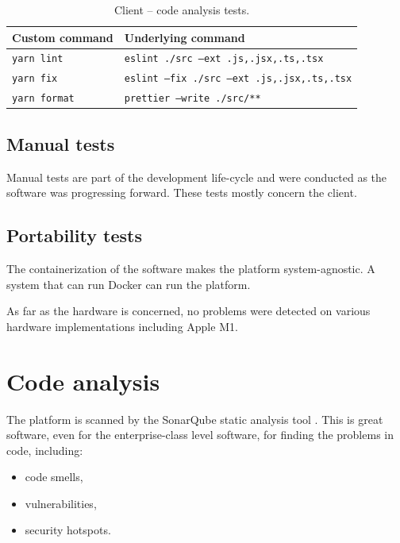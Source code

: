 \documentclass[a4paper,twoside,12pt]{book}
\begin{document}
\begin{table}%
\centering
\caption{Client – code analysis tests.}
\label{id:tab:client_tests}
\begin{tabular}{ll}
	\toprule
	Custom command               & Underlying command                                          \\
	\midrule
	\texttt{yarn lint}   & \texttt{eslint ./src --ext .js,.jsx,.ts,.tsx}       \\
	\texttt{yarn fix}    & \texttt{eslint --fix ./src --ext .js,.jsx,.ts,.tsx} \\
	\texttt{yarn format} & \texttt{prettier --write ./src/**}                  \\
	\bottomrule
\end{tabular}
\end{table}

\subsection{Manual tests}

Manual tests are part of the development life-cycle and were conducted as the software was progressing forward. These tests mostly concern the client.

\subsection{Portability tests}

The containerization of the software makes the platform system-agnostic. A system that can run Docker can run the platform.

As far as the hardware is concerned, no problems were detected on various hardware implementations including Apple M1.

\section{Code analysis}

The platform is scanned by the SonarQube static analysis tool \cite{bib:sonar}. This is great software, even for the enterprise-class level software, for finding the problems in code, including:
\begin{itemize}
\item code smells,
\item vulnerabilities,
\item security hotspots.
\end{itemize}
\end{document}
